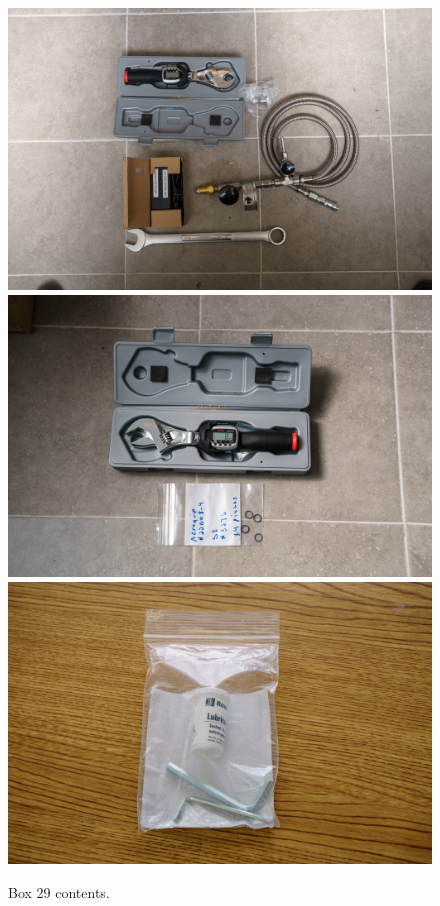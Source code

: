 \documentclass{article}
\begin{document}
\begin{figure}[bp]
\begin{center}
\includegraphics[width=0.60\linewidth]{figures/20201209T125026.jpg}
\includegraphics[width=0.60\linewidth]{figures/20201209T135331.jpg}
\includegraphics[width=0.60\linewidth]{figures/20201209T143011.jpg}
\end{center}
\caption{Box 29 contents.}
\label{figure:box-twenty-nine-contents}
\end{figure}
\end{document}
